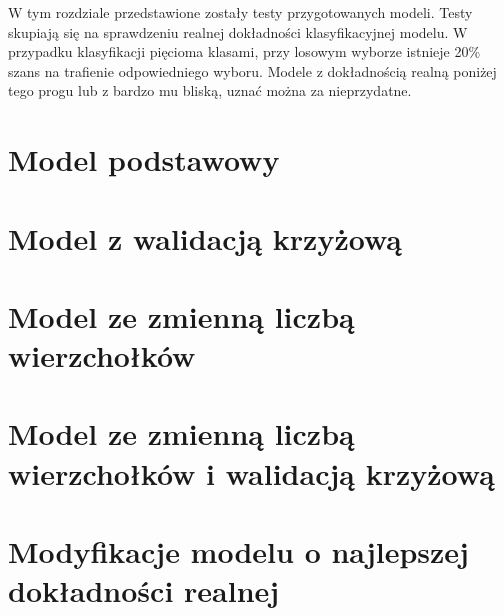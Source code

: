 W tym rozdziale przedstawione zostały testy przygotowanych modeli.
Testy skupiają się na sprawdzeniu realnej dokładności klasyfikacyjnej modelu.
W przypadku klasyfikacji pięcioma klasami, przy losowym wyborze istnieje 20\% szans na trafienie odpowiedniego wyboru.
Modele z dokładnością realną poniżej tego progu lub z bardzo mu bliską, uznać można za nieprzydatne.

\section{Model podstawowy}


\section{Model z walidacją krzyżową}


\section{Model ze zmienną liczbą wierzchołków}


\section{Model ze zmienną liczbą wierzchołków i walidacją krzyżową}


\section{Modyfikacje modelu o najlepszej dokładności realnej}
